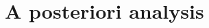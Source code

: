 \documentclass[10 pt]{beamer}
\begin{document}


\section{A posteriori analysis}
\subsection{}
\end{document}
